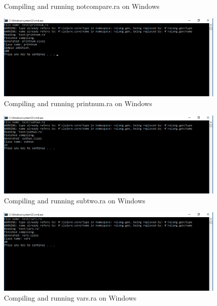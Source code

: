 \documentclass[a4paper]{article}
\begin{document}
\begin{appendices}
\begin{figure}[h!]
		\caption[Compiling and running notcompare.ra on Windows 10 32-bit]{Compiling and running notcompare.ra on Windows}
		\label{fig:windows_notcompare}
	\end{figure}
	\begin{figure}[h!]
		\centering
		\includegraphics[width=\linewidth]{images/windows_printnum.png}
		\caption[Compiling and running printnum.ra on Windows 10 32-bit]{Compiling and running printnum.ra on Windows}
		\label{fig:windows_printnum}
	\end{figure}
	\begin{figure}[h!]
		\centering
		\includegraphics[width=\linewidth]{images/windows_subtwo.png}
		\caption[Compiling and running subtwo.ra on Windows 10 32-bit]{Compiling and running subtwo.ra on Windows}
		\label{fig:windows_subtwo}
	\end{figure}
	\newpage
	\begin{figure}[h!]
		\centering
		\includegraphics[width=\linewidth]{images/windows_vars.png}
		\caption[Compiling and running vars.ra on Windows 10 32-bit]{Compiling and running vars.ra on Windows}

\end{figure}
\end{appendices}
\end{document}
